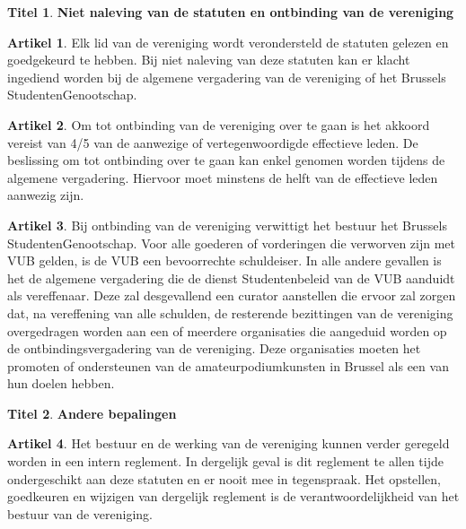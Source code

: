 \documentclass[a4paper,10pt]{article}
\theoremstyle{definition}
\newtheorem{titel}{\newline\Large Titel}
\newtheorem{artikelbase}{\large Artikel}
\newenvironment{artikel}
  {\begin{artikelbase}}
  {\smallskip
   \end{artikelbase}}
\newcommand{\ttext}[1]{\Large \textbf{#1} \normalsize}
\newcommand{\ttextcr}{\hfill\newline}
\begin{document}
\begin{titel}\ttext{Niet naleving van de statuten en ontbinding van de vereniging}

  \begin{artikel}\ttextcr
    Elk lid van de vereniging wordt verondersteld de statuten gelezen en goedgekeurd te hebben.
    Bij niet naleving van deze statuten kan er klacht ingediend worden bij de algemene vergadering van de vereniging of het Brussels StudentenGenootschap.
  \end{artikel}

  \begin{artikel}\ttextcr
    Om tot ontbinding van de vereniging over te gaan is het akkoord vereist van 4/5 van de aanwezige of vertegenwoordigde effectieve leden.
    De beslissing om tot ontbinding over te gaan kan enkel genomen worden tijdens de algemene vergadering.
    Hiervoor moet minstens de helft van de effectieve leden aanwezig zijn.
  \end{artikel}

  \begin{artikel}\ttextcr
    Bij ontbinding van de vereniging verwittigt het bestuur het Brussels StudentenGenootschap.
    Voor alle goederen of vorderingen die verworven zijn met VUB gelden, is de VUB een bevoorrechte schuldeiser.
    In alle andere gevallen is het de algemene vergadering die de dienst Studentenbeleid van de VUB aanduidt als vereffenaar.
    Deze zal desgevallend een curator aanstellen die ervoor zal zorgen dat, na vereffening van alle schulden, de resterende bezittingen van de vereniging overgedragen worden aan een of meerdere organisaties die aangeduid worden op de ontbindingsvergadering van de vereniging.
    Deze organisaties moeten het promoten of ondersteunen van de amateurpodiumkunsten in Brussel als een van hun doelen hebben.
  \end{artikel}

\end{titel}


\begin{titel}\ttext{Andere bepalingen}

  \begin{artikel}\label{varia-reglement}\ttextcr
    Het bestuur en de werking van de vereniging kunnen verder geregeld worden in een intern reglement.
    In dergelijk geval is dit reglement te allen tijde ondergeschikt aan deze statuten en er nooit mee in tegenspraak.
    Het opstellen, goedkeuren en wijzigen van dergelijk reglement is de verantwoordelijkheid van het bestuur van de vereniging.
  \end{artikel}

\end{titel}
\end{document}

